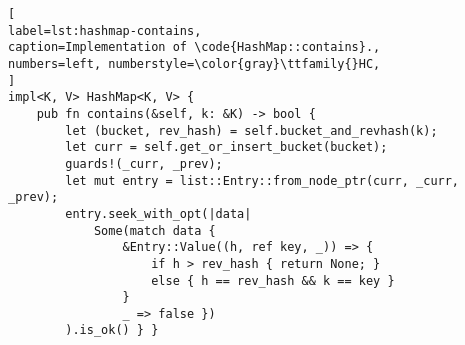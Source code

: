 \begin{lstlisting}[
label=lst:hashmap-contains,
caption=Implementation of \code{HashMap::contains}.,
numbers=left, numberstyle=\color{gray}\ttfamily{}HC,
]
impl<K, V> HashMap<K, V> {
    pub fn contains(&self, k: &K) -> bool {
        let (bucket, rev_hash) = self.bucket_and_revhash(k);
        let curr = self.get_or_insert_bucket(bucket);
        guards!(_curr, _prev);
        let mut entry = list::Entry::from_node_ptr(curr, _curr, _prev);
        entry.seek_with_opt(|data|
            Some(match data {
                &Entry::Value((h, ref key, _)) => {
                    if h > rev_hash { return None; }
                    else { h == rev_hash && k == key }
                }
                _ => false })
        ).is_ok() } }
\end{lstlisting}
